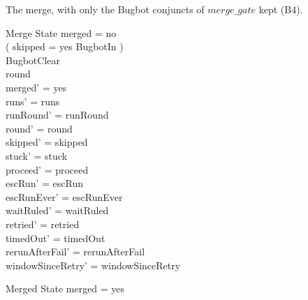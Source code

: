 \documentclass{article}
\begin{document}
The merge, with only the Bugbot conjuncts of $merge\_gate$ kept (B4).

\begin{schema}{Merge}
  \Delta State
\where
  merged = no \\
  ( skipped = yes \lor BugbotIn ) \\
  BugbotClear \\
  round  \\
  merged' = yes \\
  runs' = runs \\
  runRound' = runRound \\
  round' = round \\
  skipped' = skipped \\
  stuck' = stuck \\
  proceed' = proceed \\
  escRun' = escRun \\
  escRunEver' = escRunEver \\
  waitRuled' = waitRuled \\
  retried' = retried \\
  timedOut' = timedOut \\
  rerunAfterFail' = rerunAfterFail \\
  windowSinceRetry' = windowSinceRetry
\end{schema}

\begin{schema}{Merged}
  \Xi State
\where
  merged = yes
\end{schema}
\end{document}

